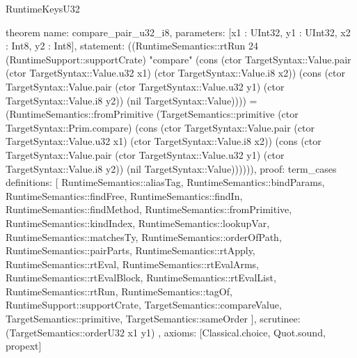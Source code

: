 \begin{lexlean}{RuntimeKeysU32}
\begin{semanticmodule}
theorem{
  name: compare_pair_u32_i8,
  parameters: [x1 : UInt32, y1 : UInt32, x2 : Int8, y2 : Int8],
  statement: ((RuntimeSemantics::rtRun 24 (RuntimeSupport::supportCrate) "compare" (cons (ctor TargetSyntax::Value.pair (ctor TargetSyntax::Value.u32 x1) (ctor TargetSyntax::Value.i8 x2)) (cons (ctor TargetSyntax::Value.pair (ctor TargetSyntax::Value.u32 y1) (ctor TargetSyntax::Value.i8 y2)) (nil TargetSyntax::Value)))) = (RuntimeSemantics::fromPrimitive (TargetSemantics::primitive (ctor TargetSyntax::Prim.compare) (cons (ctor TargetSyntax::Value.pair (ctor TargetSyntax::Value.u32 x1) (ctor TargetSyntax::Value.i8 x2)) (cons (ctor TargetSyntax::Value.pair (ctor TargetSyntax::Value.u32 y1) (ctor TargetSyntax::Value.i8 y2)) (nil TargetSyntax::Value)))))),
  proof: term_cases{
    definitions: [
      RuntimeSemantics::aliasTag,
      RuntimeSemantics::bindParams,
      RuntimeSemantics::findFree,
      RuntimeSemantics::findIn,
      RuntimeSemantics::findMethod,
      RuntimeSemantics::fromPrimitive,
      RuntimeSemantics::kindIndex,
      RuntimeSemantics::lookupVar,
      RuntimeSemantics::matchesTy,
      RuntimeSemantics::orderOfPath,
      RuntimeSemantics::pairParts,
      RuntimeSemantics::rtApply,
      RuntimeSemantics::rtEval,
      RuntimeSemantics::rtEvalArms,
      RuntimeSemantics::rtEvalBlock,
      RuntimeSemantics::rtEvalList,
      RuntimeSemantics::rtRun,
      RuntimeSemantics::tagOf,
      RuntimeSupport::supportCrate,
      TargetSemantics::compareValue,
      TargetSemantics::primitive,
      TargetSemantics::sameOrder
    ],
    scrutinee: (TargetSemantics::orderU32 x1 y1)
  },
  axioms: [Classical.choice, Quot.sound, propext]
}


\end{semanticmodule}
\end{lexlean}

